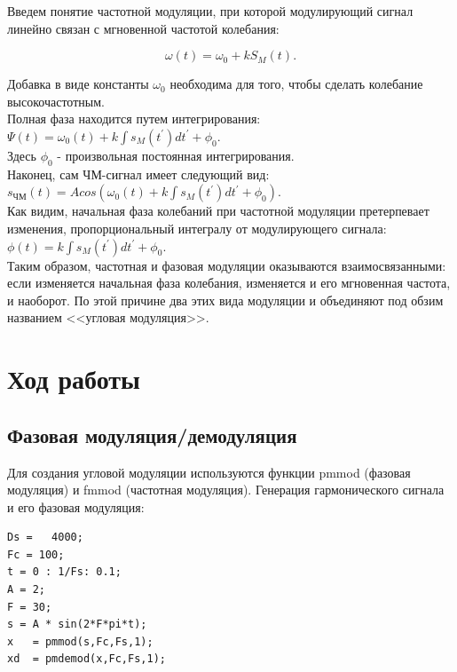 \documentclass[a4paper,14pt]{article}
\begin{document}
Введем понятие частотной модуляции, при которой модулирующий сигнал линейно связан с мгновенной частотой колебания:

\[
	\omega(t) = \omega_0 + kS_M(t).
\]

Добавка в виде константы $\omega _{0}$ необходима для того, чтобы сделать колебание высокочастотным.\\

Полная фаза находится путем интегрирования:\\

$\Psi (t)=\omega _{0}(t)+k\int s_{M}({t}^{\prime })d{t}^{\prime }+\phi _{0}$.\\

Здесь $\phi _{0}$ - произвольная постоянная интегрирования.\\

Наконец, сам ЧМ-сигнал имеет следующий вид:\\

$s_{ЧМ}(t)=Acos(\omega _{0}(t)+k\int s_{M}({t}^{\prime })d{t}^{\prime }+\phi _{0})$.\\

Как видим, начальная фаза колебаний при частотной модуляции претерпевает изменения, пропорциональный интегралу от модулирующего сигнала:\\

$\phi (t)=k\int s_{M}({t}^{\prime })d{t}^{\prime }+\phi _{0}$.\\

Таким образом, частотная и фазовая модуляции оказываются взаимосвязанными: если изменяется начальная фаза колебания, изменяется и его мгновенная частота, и наоборот. По этой причине два этих вида модуляции и объединяют под обзим названием <<угловая модуляция>>.\\

\section{Ход работы}
\subsection{Фазовая модуляция/демодуляция}
Для создания угловой модуляции используются функции  pmmod (фазовая модуляция) и fmmod (частотная модуляция).
Генерация гармонического сигнала и его фазовая модуляция:

\begin{lstlisting}
Ds =   4000; 
Fc = 100;
t = 0 : 1/Fs: 0.1; 
A = 2; 
F = 30;
s = A * sin(2*F*pi*t);
x 	= pmmod(s,Fc,Fs,1);
xd 	= pmdemod(x,Fc,Fs,1);
\end{lstlisting}
\end{document}
